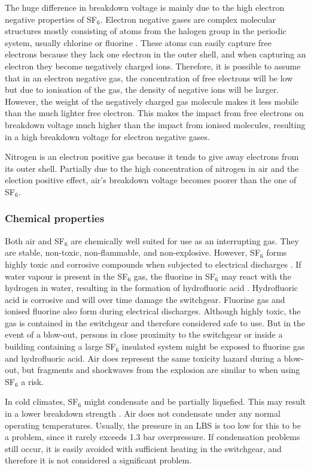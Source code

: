\documentclass[10pt,a4paper,twoside]{article}
\begin{document}
The huge difference in breakdown voltage is mainly due to the high electron negative properties of SF$_6$. Electron negative gases are complex molecular structures mostly consisting of atoms from the halogen group in the periodic system, usually chlorine or fluorine \cite{bib:TET4160HVIM}. These atoms can easily capture free electrons because they lack one electron in the outer shell, and when capturing an electron they become negatively charged ions. Therefore, it is possible to assume that in an electron negative gas, the concentration of free electrons will be low but due to ionisation of the gas, the density of negative ions will be larger. However, the weight of the negatively charged gas molecule makes it less mobile than the much lighter free electron. This makes the impact from free electrons on breakdown voltage much higher than the impact from ionised molecules, resulting in a high breakdown voltage for electron negative gases.

Nitrogen is an electron positive gas because it tends to give away electrons from its outer shell. Partially due to the high concentration of nitrogen in air and the election positive effect, air's breakdown voltage becomes poorer than the one of SF$_6$.

\subsubsection*{Chemical properties}
Both air and SF$_6$ are chemically well suited for use as an interrupting gas. They are stable, non-toxic, non-flammable, and non-explosive. However, SF$_6$ forms highly toxic and corrosive compounds when subjected to electrical discharges \cite{bib:SF6PI}. If water vapour is present in the SF$_6$ gas, the fluorine in SF$_6$ may react with the hydrogen in water, resulting in the formation of hydrofluoric acid \cite{bib:SF6PI}. Hydrofluoric acid is corrosive and will over time damage the switchgear. Fluorine gas and ionised fluorine also form during electrical discharges. Although highly toxic, the gas is contained in the switchgear and therefore considered safe to use. But in the event of a blow-out, persons in close proximity to the switchgear or inside a building containing a large SF$_6$ insulated system might be exposed to fluorine gas and hydrofluoric acid. Air does represent the same toxicity hazard during a blow-out, but fragments and shockwaves from the explosion are similar to when using SF$_6$ a risk.

In cold climates, SF$_6$ might condensate and be partially liquefied. This may result in a lower breakdown strength \cite{bib:SF6PI}. Air does not condensate under any normal operating temperatures. Usually, the pressure in an LBS is too low for this to be a problem, since it rarely exceeds 1.3 bar overpressure. If condensation problems still occur, it is easily avoided with sufficient heating in the switchgear, and therefore it is not considered a significant problem.
\end{document}
